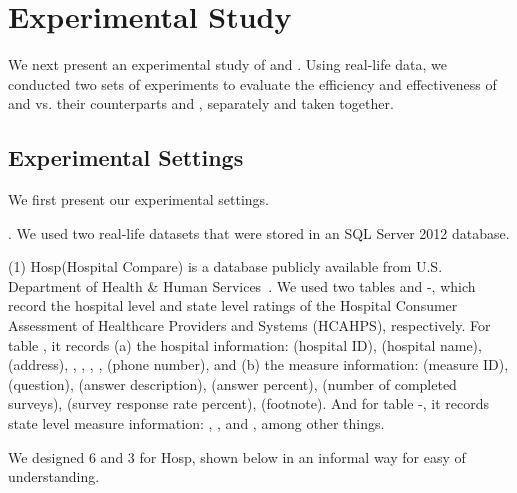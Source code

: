 \newcommand{\dblp}{{\sc Dblp}\xspace}
\newcommand{\hosp}{{\sc Hosp}\xspace}
\newcommand{\hcahps}{{\sc hcahps}\xspace}



\section{Experimental Study}
\label{sec-exp}

We next present an experimental study of \pCFDs and \pCINDs. Using real-life data, we conducted two sets of experiments to evaluate the efficiency and effectiveness of \pCFDs and \pCINDs vs. their counterparts \CFDs and \CINDs, separately and taken together.

\subsection{Experimental Settings}
We first present our experimental settings.

. We used two real-life datasets that were stored in an SQL Server 2012 database.

\ni(1) \hosp (Hospital Compare) is a database publicly available from U.S. Department of Health %
\& Human Services~\cite{hosp}. We used two tables  and -, which record the hospital level and state level ratings of the Hospital Consumer Assessment of Healthcare Providers and Systems (HCAHPS), respectively.
%
For table , it records (a) the hospital information:  (hospital ID),  (hospital name),  (address), , , , ,  (phone number), and (b) the measure information:  (measure ID),  (question),  (answer description),  (answer percent),  (number of completed surveys),  (survey response rate percent),  (footnote).
%
And for table -, it records state level measure information: , ,  and , among other things.


We designed 6 \pCFDs and 3 \pCINDs for \hosp, shown below in an informal way for easy of understanding.

